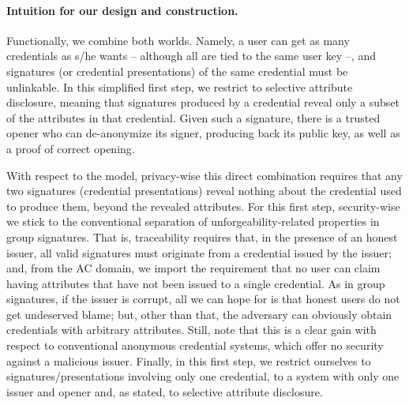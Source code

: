 \paragraph{Intuition for our design and construction.} %
Functionally, we combine both worlds. Namely, a user can get as many credentials
as s/he wants -- although all are tied to the same user key --, and signatures
(or credential presentations) of the same credential must be unlinkable. In this
simplified first step, we restrict to selective attribute disclosure, meaning
that signatures produced by a credential reveal only a subset of the attributes
in that credential. Given such a signature, there is a trusted opener who can
de-anonymize its signer, producing back its public key, as well as a proof of
correct opening.

With respect to the model, privacy-wise this direct combination requires that
any two signatures (credential presentations) reveal nothing about the
credential used to produce them, beyond the revealed attributes. For this first
step, security-wise we stick to the conventional separation of
unforgeability-related properties in group signatures. That is, traceability
requires that, in the presence of an honest issuer, all valid signatures must
originate from a credential issued by the issuer; and, from the AC domain, we
import the requirement that no user can claim having attributes that have not
been issued to a single credential. As in group signatures, if the issuer is
corrupt, all we can hope for is that honest users do not get undeserved blame;
but, other than that, the adversary can obviously obtain credentials with
arbitrary attributes. Still, note that this is a clear gain with respect to
conventional anonymous credential systems, which offer no security against a
malicious issuer.
%
Finally, in this first step, we restrict ourselves to signatures/presentations
involving only one credential, to a system with only one issuer and opener  and,
as stated, to selective attribute disclosure.






